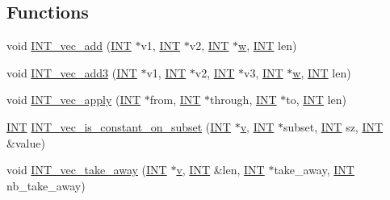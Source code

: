 \subsection*{Functions}
\begin{DoxyCompactItemize}
\item 
void \mbox{\hyperlink{util_8_c_abdc7f1105bbaef14bcbf1b5095f687c9}{I\+N\+T\+\_\+vec\+\_\+add}} (\mbox{\hyperlink{galois_8h_a09fddde158a3a20bd2dcadb609de11dc}{I\+NT}} $\ast$v1, \mbox{\hyperlink{galois_8h_a09fddde158a3a20bd2dcadb609de11dc}{I\+NT}} $\ast$v2, \mbox{\hyperlink{galois_8h_a09fddde158a3a20bd2dcadb609de11dc}{I\+NT}} $\ast$\mbox{\hyperlink{alphabet2_8_c_aac374e320caaadeca4874add33b62af2}{w}}, \mbox{\hyperlink{galois_8h_a09fddde158a3a20bd2dcadb609de11dc}{I\+NT}} len)
\item 
void \mbox{\hyperlink{util_8_c_a5fb9f390a6d5ff2af38251ee134f12cf}{I\+N\+T\+\_\+vec\+\_\+add3}} (\mbox{\hyperlink{galois_8h_a09fddde158a3a20bd2dcadb609de11dc}{I\+NT}} $\ast$v1, \mbox{\hyperlink{galois_8h_a09fddde158a3a20bd2dcadb609de11dc}{I\+NT}} $\ast$v2, \mbox{\hyperlink{galois_8h_a09fddde158a3a20bd2dcadb609de11dc}{I\+NT}} $\ast$v3, \mbox{\hyperlink{galois_8h_a09fddde158a3a20bd2dcadb609de11dc}{I\+NT}} $\ast$\mbox{\hyperlink{alphabet2_8_c_aac374e320caaadeca4874add33b62af2}{w}}, \mbox{\hyperlink{galois_8h_a09fddde158a3a20bd2dcadb609de11dc}{I\+NT}} len)
\item 
void \mbox{\hyperlink{util_8_c_a213a3e5aef54660073ad609492538df6}{I\+N\+T\+\_\+vec\+\_\+apply}} (\mbox{\hyperlink{galois_8h_a09fddde158a3a20bd2dcadb609de11dc}{I\+NT}} $\ast$from, \mbox{\hyperlink{galois_8h_a09fddde158a3a20bd2dcadb609de11dc}{I\+NT}} $\ast$through, \mbox{\hyperlink{galois_8h_a09fddde158a3a20bd2dcadb609de11dc}{I\+NT}} $\ast$to, \mbox{\hyperlink{galois_8h_a09fddde158a3a20bd2dcadb609de11dc}{I\+NT}} len)
\item 
\mbox{\hyperlink{galois_8h_a09fddde158a3a20bd2dcadb609de11dc}{I\+NT}} \mbox{\hyperlink{util_8_c_a7536bf61db31b017af715b1dc756feb7}{I\+N\+T\+\_\+vec\+\_\+is\+\_\+constant\+\_\+on\+\_\+subset}} (\mbox{\hyperlink{galois_8h_a09fddde158a3a20bd2dcadb609de11dc}{I\+NT}} $\ast$\mbox{\hyperlink{simeon_8_c_aeb3f3030944801b163bc3b829a7f6710}{v}}, \mbox{\hyperlink{galois_8h_a09fddde158a3a20bd2dcadb609de11dc}{I\+NT}} $\ast$subset, \mbox{\hyperlink{galois_8h_a09fddde158a3a20bd2dcadb609de11dc}{I\+NT}} sz, \mbox{\hyperlink{galois_8h_a09fddde158a3a20bd2dcadb609de11dc}{I\+NT}} \&value)
\item 
void \mbox{\hyperlink{util_8_c_a5e3e555b59057fec5f63486c07fed043}{I\+N\+T\+\_\+vec\+\_\+take\+\_\+away}} (\mbox{\hyperlink{galois_8h_a09fddde158a3a20bd2dcadb609de11dc}{I\+NT}} $\ast$\mbox{\hyperlink{simeon_8_c_aeb3f3030944801b163bc3b829a7f6710}{v}}, \mbox{\hyperlink{galois_8h_a09fddde158a3a20bd2dcadb609de11dc}{I\+NT}} \&len, \mbox{\hyperlink{galois_8h_a09fddde158a3a20bd2dcadb609de11dc}{I\+NT}} $\ast$take\+\_\+away, \mbox{\hyperlink{galois_8h_a09fddde158a3a20bd2dcadb609de11dc}{I\+NT}} nb\+\_\+take\+\_\+away)

\end{DoxyCompactItemize}
